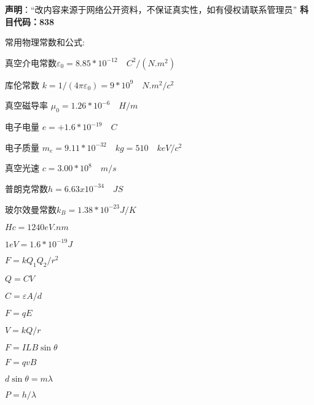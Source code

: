 
\textbf{声明}：“改内容来源于网络公开资料，不保证真实性，如有侵权请联系管理员”
\textbf{科目代码：838}

常用物理常数和公式:

真空介电常数$\varepsilon_0=8.85 *10^{-12} \quad C^2/(N.m^2)$

库伦常数 $k=1/(4\pi \varepsilon_0)=9*10^9 \quad N.m^2/c^2$

真空磁导率 $\mu_0=1.26*10^{-6}\quad H/m$

电子电量 $e=+1.6*10^{-19}\quad C$

电子质量 $m_e=9.11*10^{-32}\quad kg=510 \quad keV/c^2$

真空光速 $c=3.00* 10^8 \quad m/s$

普朗克常数$h=6.63x10^{-34}\quad JS$

玻尔效曼常数$k_B =1.38*10^{-23}J/K$

$Hc=1240 eV.nm$

$1 eV=1.6*10^{-19}J$

$F=k Q_1 Q_2/r^2$

$Q=CV$

$C=\varepsilon A/d$

$F=qE$

$V=kQ/r$

$F=ILB\sin \theta$

$F=qvB$

$d\sin \theta =m\lambda $

$P=h/\lambda$

